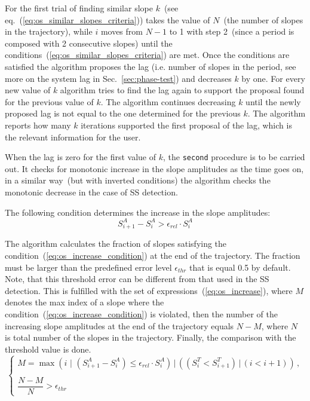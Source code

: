 \documentclass[11pt,a4paper]{article}
\begin{document}
For the first trial of finding similar slope $k$~(see
eq.~(\ref{eq:os_similar_slopes_criteria})) takes the value of $N$~(the number of
slopes in the trajectory), while $i$ moves from $N-1$ to 1 with step 2~(since a
period is composed with 2 consecutive slopes) until the
conditions~(\ref{eq:os_similar_slopes_criteria}) are met. Once the conditions are
satisfied the algorithm proposes the lag (i.e. number of slopes in the period, see
more on the system lag in Sec.~\ref{sec:phase-test}) and decreases $k$ by one. For
every new value of $k$ algorithm tries to find the lag again to support the proposal
found for the previous value of $k$. The algorithm continues decreasing $k$ until the
newly proposed lag is not equal to the one determined for the previous $k$. The
algorithm reports how many $k$ iterations supported the first proposal of the lag,
which is the relevant information for the user.

When the lag is zero for the first value of $k$, the \texttt{second} procedure is to
be carried out. It checks for monotonic increase in the slope amplitudes as the time
goes on, in a similar way~(but with inverted conditions) the algorithm checks the
monotonic decrease in the case of SS detection.

The following condition determines the increase in the slope amplitudes:
\begin{equation}
  \label{eq:os_increase_condition}
  S^A_{i+1}-S^A_i > \epsilon_{rel}\cdot S^A_i
\end{equation}

The algorithm calculates the fraction of slopes satisfying the
condition~(\ref{eq:os_increase_condition}) at the end of the trajectory. The fraction
must be larger than the predefined error level $\epsilon_{thr}$ that is equal 0.5 by
default. Note, that this threshold error can be different from that used in the SS
detection. This is fulfilled with the set of expressions~(\ref{eq:os_increase}),
where $M$ denotes the max index of a slope where the
condition~(\ref{eq:os_increase_condition}) is violated, then the number of the
increasing slope amplitudes at the end of the trajectory equals $N-M$, where $N$ is
total number of the slopes in the trajectory. Finally, the comparison with the
threshold value is done.
\begin{equation}
  \label{eq:os_increase}
  \left \{
  \begin{matrix}
    M = \max\left(i\,\, |\,\, (S^A_{i+1}-S^A_{i}) \le \epsilon_{rel}\cdot
      S^A_{i}\right)\,|\, \left( (S^T_i < S^T_{i+1}) \,|\, (i < i+1)\right)\,, \\
    \\
    \dfrac{N-M}{N} > \epsilon_{thr}
  \end{matrix}
  \right .
\end{equation}
\end{document}
